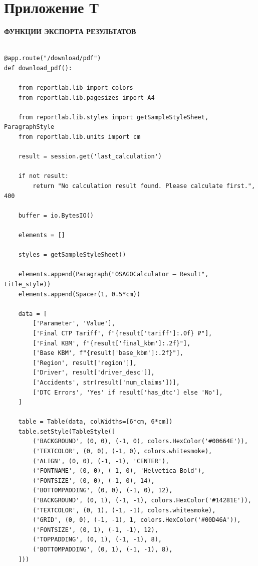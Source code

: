 \newpage
\section*{Приложение Т}
\label{app:export}
\begin{center}
\textbf{ФУНКЦИИ ЭКСПОРТА РЕЗУЛЬТАТОВ}
\end{center}

\vspace{1cm}

\begin{lstlisting}[caption={Экспорт в PDF, CSV и PNG}, label={lst:export}    
    breakatwhitespace=true,
    breakindent=10pt,
    columns=fullflexible
]

@app.route("/download/pdf")
def download_pdf():

    from reportlab.lib import colors
    from reportlab.lib.pagesizes import A4

    from reportlab.lib.styles import getSampleStyleSheet, ParagraphStyle
    from reportlab.lib.units import cm

    result = session.get('last_calculation')
    
    if not result:
        return "No calculation result found. Please calculate first.", 400
    
    buffer = io.BytesIO()

    elements = []
    
    styles = getSampleStyleSheet()

    elements.append(Paragraph("OSAGOCalculator — Result", title_style))
    elements.append(Spacer(1, 0.5*cm))
    
    data = [
        ['Parameter', 'Value'],
        ['Final CTP Tariff', f"{result['tariff']:.0f} ₽"],
        ['Final KBM', f"{result['final_kbm']:.2f}"],
        ['Base KBM', f"{result['base_kbm']:.2f}"],
        ['Region', result['region']],
        ['Driver', result['driver_desc']],
        ['Accidents', str(result['num_claims'])],
        ['DTC Errors', 'Yes' if result['has_dtc'] else 'No'],
    ]
    
    table = Table(data, colWidths=[6*cm, 6*cm])
    table.setStyle(TableStyle([
        ('BACKGROUND', (0, 0), (-1, 0), colors.HexColor('#00664E')),
        ('TEXTCOLOR', (0, 0), (-1, 0), colors.whitesmoke),
        ('ALIGN', (0, 0), (-1, -1), 'CENTER'),
        ('FONTNAME', (0, 0), (-1, 0), 'Helvetica-Bold'),
        ('FONTSIZE', (0, 0), (-1, 0), 14),
        ('BOTTOMPADDING', (0, 0), (-1, 0), 12),
        ('BACKGROUND', (0, 1), (-1, -1), colors.HexColor('#14281E')),
        ('TEXTCOLOR', (0, 1), (-1, -1), colors.whitesmoke),
        ('GRID', (0, 0), (-1, -1), 1, colors.HexColor('#00D46A')),
        ('FONTSIZE', (0, 1), (-1, -1), 12),
        ('TOPPADDING', (0, 1), (-1, -1), 8),
        ('BOTTOMPADDING', (0, 1), (-1, -1), 8),
    ]))
    

\end{lstlisting}
